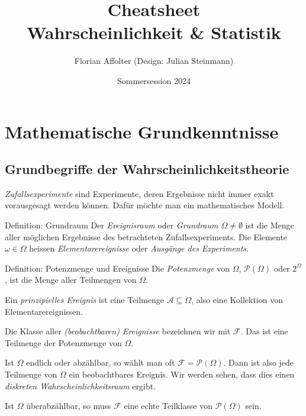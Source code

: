 \documentclass[a4paper,10pt]{article}
\title{Cheatsheet\\ Wahrscheinlichkeit \& Statistik}
\author{Florian Affolter (Design: Julian Steinmann)}
\date{\vspace{-10pt}Sommersession 2024}
\begin{document}
\small


% 


\section{Mathematische Grundkenntnisse}

\subsection{Grundbegriffe der Wahrscheinlichkeitstheorie}

\emph{Zufallsexperimente} sind Experimente, deren Ergebnisse nicht immer exakt vorausgesagt werden können. Dafür möchte man ein mathematisches Modell.

\begin{mainbox}{Definition: Grundraum}
    Der \emph{Ereignisraum} oder \emph{Grundraum \( \Omega \neq \emptyset \)} ist die Menge aller möglichen Ergebnisse des betrachteten Zufallsexperiments. Die Elemente \( \omega \in \Omega \) heissen \emph{Elementarereignisse} oder \emph{Ausgänge des Experiments}.
\end{mainbox}

\begin{mainbox}{Definition: Potenzmenge und Ereignisse}
    Die \emph{Potenzmenge} von \( \Omega \), \( \mathcal{P}(\Omega) \) oder \( 2^\Omega \), ist die Menge aller Teilmengen von \( \Omega \).

    Ein \emph{prinzipielles Ereignis} ist eine Teilmenge \( \mathcal{A} \subseteq \Omega \), also eine Kollektion von Elementarereignissen.

    Die Klasse aller \emph{(beobachtbaren) Ereignisse} bezeichnen wir mit \( \mathcal{F} \). Das ist eine Teilmenge der Potenzmenge von \( \Omega \).
\end{mainbox}

Ist \( \Omega \) endlich oder abzählbar, so wählt man oft \( \mathcal{F} = \mathcal{P}(\Omega) \). Dann ist also jede Teilmenge von \( \Omega \) ein beobachtbares Ereignis. Wir werden sehen, dass dies einen \emph{diskreten Wahrscheinlichkeitsraum} ergibt.

Ist \( \Omega \) überabzählbar, so muss \( \mathcal{F} \) eine echte Teilklasse von \( \mathcal{P}(\Omega) \) sein.
\end{document}
